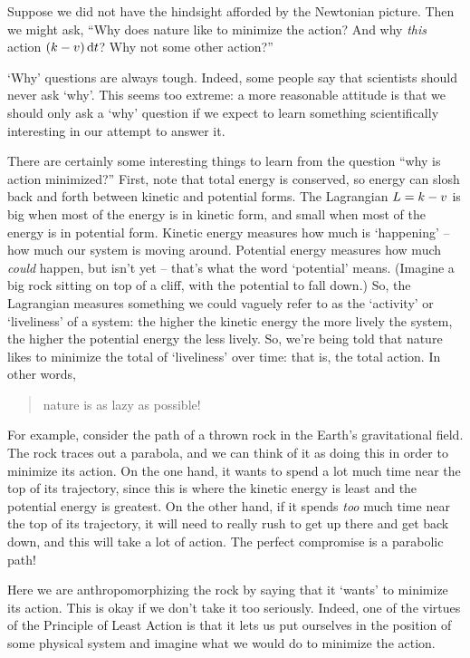 Suppose we did not have the hindsight afforded by the Newtonian picture. Then we might ask, ``Why does nature like to minimize the action? And why \emph{this} action $(k - v)\,\text{d} t$? Why not some other action?''

`Why' questions are always tough. Indeed, some people say that scientists should never ask `why'. This seems too extreme: a more reasonable attitude is that we should only ask a `why' question if we expect to learn something scientifically interesting in our attempt to answer it. 

There are certainly some interesting things to learn from the question ``why is action minimized?'' First, note that total energy is conserved, so energy can slosh back and forth between kinetic and potential forms. The Lagrangian $L = k - v$ is big when most of the energy is in kinetic form, and small when most of the energy is in potential form. Kinetic energy measures how much is `happening' -- how much our system is moving around. Potential energy measures how much \emph{could} happen, but isn't yet -- that's what the word `potential' means. (Imagine a big rock sitting on top of a cliff, with the potential to fall down.) So, the Lagrangian measures something we could vaguely refer to as the `activity' or `liveliness' of a system: the higher the kinetic energy the more lively the system, the higher the potential energy the less lively. So, we're being told that nature likes to minimize the total of `liveliness' over time: that is, the total action. In other words,
\begin{quote}
nature is as lazy as possible!
\end{quote}

For example, consider the path of a thrown rock in the Earth's gravitational field. The rock traces out a parabola, and we can think of it as doing this in order to minimize its action. On the one hand, it wants to spend a lot much time near the top of its trajectory, since this is where the kinetic energy is least and the potential energy is greatest. On the other hand, if it spends \emph{too} much time near the top of its trajectory, it will need to really rush to get up there and get back down, and this will take a lot of action. The perfect compromise is a parabolic path!

Here we are anthropomorphizing the rock by saying that it `wants' to minimize its action. This is okay if we don't take it too seriously. Indeed, one of the virtues of the Principle of Least Action is that it lets us put ourselves in the position of some physical system and imagine what we would do to minimize the action.


